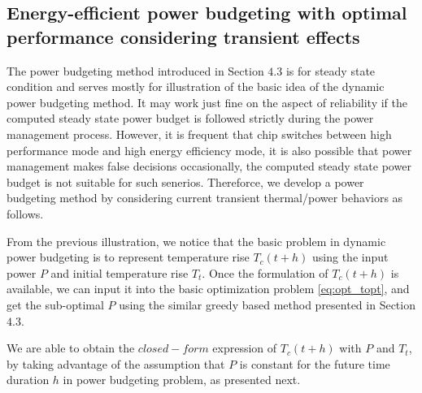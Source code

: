\subsection{Energy-efficient power budgeting with optimal performance considering transient effects}
The power budgeting method introduced in Section $4.3$ is for steady state condition and serves mostly for illustration of the basic idea of the dynamic power budgeting method. It may work just fine on the aspect of reliability if the computed steady state power budget is followed strictly during the power management process. However, it is frequent that chip switches between high performance mode and high energy efficiency mode, it is also possible that power management makes false decisions occasionally, the computed steady state power budget is not suitable for such senerios. Thereforce, we develop a power budgeting method by considering current transient thermal/power behaviors as follows.

From the previous illustration, we notice that the basic problem in dynamic power budgeting is to represent temperature rise $T_{c}(t+h)$ using the input power $P$ and initial temperature rise $T_{t}$. Once the formulation of $T_{c}(t+h)$ is available, we can input it into the basic optimization problem \eqref{eq:opt_topt}, and get the sub-optimal $P$ using the similar greedy based method presented in Section $4.3$.

We are able to obtain the $closed-form$ expression of $T_{c}(t+h)$ with $P$ and $T_{t}$, by taking advantage of the assumption that $P$ is constant for the future time duration $h$ in power budgeting problem, as presented next.

